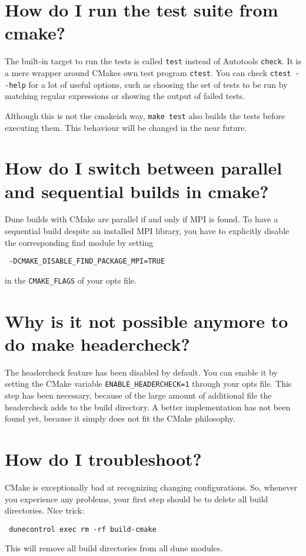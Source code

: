 \documentclass[a4paper,10pt,DIV9,headings=small]{scrartcl}
\begin{document}
\section{How do I run the test suite from cmake?}
\label{tests}
The built-in target to run the tests is called \lstinline!test! instead of Autotools \lstinline!check!.
It is a mere wrapper around CMakes own test program \lstinline!ctest!. You can check \lstinline!ctest --help!
for a lot of useful options, such as choosing the set of tests to be run by matching regular expressions or
showing the output of failed tests.

Although this is not the cmakeish way, \lstinline!make test! also builds the tests before executing them. This behaviour will be changed in the near future.

\section{How do I switch between parallel and sequential builds in cmake?}
\label{parallel}
Dune builds with CMake are parallel if and only if MPI is found. To have a sequential build despite an installed MPI library, you have to explicitly disable the corresponding find module by setting
\begin{lstlisting}
 -DCMAKE_DISABLE_FIND_PACKAGE_MPI=TRUE
\end{lstlisting}
in the \lstinline!CMAKE_FLAGS! of your opts file.

\section{Why is it not possible anymore to do make headercheck?}
\label{headercheck}
The headercheck feature has been disabled by default. You can enable it by setting the CMake variable \lstinline!ENABLE_HEADERCHECK=1! through your opts file. This step has been necessary, because of the large amount of additional file the headercheck adds to the build directory. A better implementation has not been found yet, because it simply does not fit the CMake philosophy.

\section{How do I troubleshoot?}
\label{troubleshoot}
CMake is exceptionally bad at recognizing changing configurations. So, whenever you experience any problems, your first step should be to delete all build directories. Nice trick:
\begin{lstlisting}
 dunecontrol exec rm -rf build-cmake
\end{lstlisting}
This will remove all build directories from all dune modules.
\end{document}
